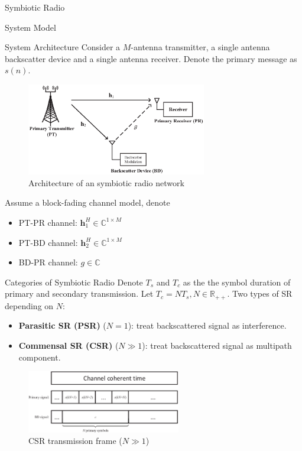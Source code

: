 \documentclass[9pt]{beamer}
\begin{document}
	\begin{section}{Symbiotic Radio}
		\begin{subsection}{System Model}
			\begin{frame}{System Architecture}
				Consider a $M$-antenna transmitter, a single antenna backscatter device and a single antenna receiver. Denote the primary message as $s(n)$.
				\begin{figure}
					\centering
					\includegraphics[width=0.7\textwidth]{assets/symbiotic_radio.eps}
					\caption{Architecture of an symbiotic radio network \cite{Long2019a}}
					\label{fi:symbiotic_radio}
				\end{figure}
				Assume a block-fading channel model, denote
				\begin{itemize}
					\item PT-PR channel: $\boldsymbol{h}_1^H \in \mathbb{C}^{1 \times M}$
					\item PT-BD channel: $\boldsymbol{h}_2^H \in \mathbb{C}^{1 \times M}$
					\item BD-PR channel: $g \in \mathbb{C}$
				\end{itemize}
			\end{frame}

			\begin{frame}{Categories of Symbiotic Radio}
				Denote $T_{s}$ and $T_{c}$ as the the symbol duration of primary and secondary transmission. Let $T_{c}=NT_{s},N \in \mathbb{R}_{++}$. Two types of SR depending on $N$:
				\begin{itemize}
					\item \textbf{Parasitic SR (PSR)} ($N=1$): treat backscattered signal as interference.
					\item \textbf{Commensal SR (CSR)} ($N \gg 1$): treat backscattered signal as multipath component.
				\end{itemize}
				\begin{figure}
					\centering
					\includegraphics[width=0.6\textwidth]{assets/csr_frames.png}
					\caption{CSR transmission frame ($N \gg 1$) \cite{Long2019a}}
					\label{fi:csr_frames}
				\end{figure}
			\end{frame}


\end{subsection}
\end{section}
\end{document}
